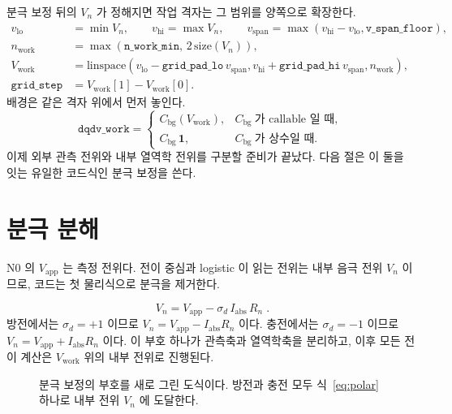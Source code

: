 \documentclass[11pt,a4paper]{article}
\newcommand{\app}{\mathrm{app}}
\newcommand{\bg}{\mathrm{bg}}
\newcommand{\work}{\mathrm{work}}
\newcommand{\abs}{\mathrm{abs}}
\newcommand{\lo}{\mathrm{lo}}
\newcommand{\hi}{\mathrm{hi}}
\begin{document}
분극 보정 뒤의 $V_n$ 가 정해지면 작업 격자는 그 범위를 양쪽으로 확장한다.
\begin{align}
v_{\lo}&=\min V_n,\qquad v_{\hi}=\max V_n,\qquad
v_{\mathrm{span}}=\max(v_{\hi}-v_{\lo},\texttt{v\_span\_floor}),\label{eq:vspan}\\
n_{\work}&=\max(\texttt{n\_work\_min},\,2\,\mathrm{size}(V_n)),\label{eq:nwork}\\
V_{\work}&=\mathrm{linspace}\!\left(v_{\lo}-\texttt{grid\_pad\_lo}\,v_{\mathrm{span}},
v_{\hi}+\texttt{grid\_pad\_hi}\,v_{\mathrm{span}},n_{\work}\right),\label{eq:vwork}\\
\texttt{grid\_step}&=V_{\work}[1]-V_{\work}[0].\label{eq:gridstep}
\end{align}
배경은 같은 격자 위에서 먼저 놓인다.
\begin{equation}
\texttt{dqdv\_work}=
\begin{cases}
C_{\bg}(V_{\work}),& C_{\bg}\ \text{가 callable 일 때},\\
C_{\bg}\,\bm 1,& C_{\bg}\ \text{가 상수일 때}.
\end{cases}
\label{eq:cbgwork}
\end{equation}
이제 외부 관측 전위와 내부 열역학 전위를 구분할 준비가 끝났다. 다음 절은 이 둘을 잇는 유일한 코드식인 분극 보정을 쓴다.

\section{분극 분해}\label{sec:n1}
N0 의 $V_{\app}$ 는 측정 전위다. 전이 중심과 logistic 이 읽는 전위는 내부 음극 전위 $V_n$ 이므로, 코드는 첫 물리식으로 분극을 제거한다.

\begin{equation}
\boxed{\;V_n=V_{\app}-\sigma_d\,I_{\abs}\,R_n\;.}
\label{eq:polar}
\end{equation}
방전에서는 $\sigma_d=+1$ 이므로 $V_n=V_{\app}-I_{\abs}R_n$ 이다. 충전에서는 $\sigma_d=-1$ 이므로 $V_n=V_{\app}+I_{\abs}R_n$ 이다. 이 부호 하나가 관측축과 열역학축을 분리하고, 이후 모든 전이 계산은 $V_{\work}$ 위의 내부 전위로 진행된다.

\begin{figure}[t]
\centering
{}
\caption{분극 보정의 부호를 새로 그린 도식이다. 방전과 충전 모두 식~\eqref{eq:polar} 하나로 내부 전위 $V_n$ 에 도달한다.}
\label{fig:polar}
\end{figure}
\end{document}
